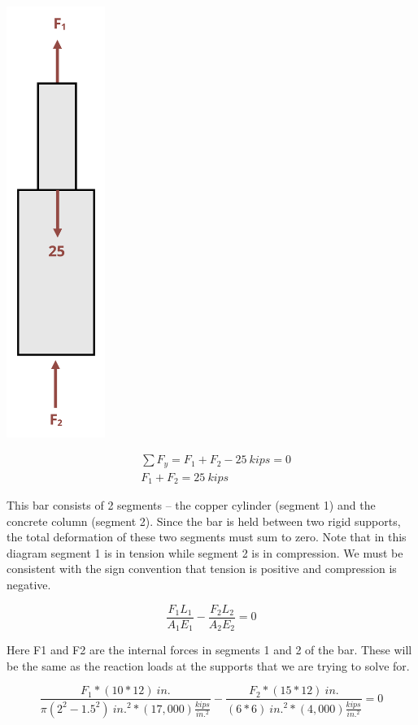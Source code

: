 \documentclass[
  letterpaper,
  DIV=11,
  numbers=noendperiod]{scrreprt}
\theoremstyle{definition}
\theoremstyle{remark}
\begin{document}
\begin{tcolorbox}
\begin{tcolorbox}
\begin{center}
\includegraphics[width=1.26042in,height=\textheight]{images/PNGs/Example 5.6 part 2.png}
\end{center}

\[
\begin{aligned}
& \sum F_y=F_1+F_2-25{~kips}=0 \\
& F_1+F_2=25{~kips}
\end{aligned}
\]

This bar consists of 2 segments -- the copper cylinder (segment 1) and
the concrete column (segment 2). Since the bar is held between two rigid
supports, the total deformation of these two segments must sum to zero.
Note that in this diagram segment 1 is in tension while segment 2 is in
compression. We must be consistent with the sign convention that tension
is positive and compression is negative.

\[
\frac{F_1 L_1}{A_1 E_1}-\frac{F_2 L_2}{A_2 E_2}=0
\]

Here F1 and F2 are the internal forces in segments 1 and 2 of the bar.
These will be the same as the reaction loads at the supports that we are
trying to solve for.

\[
\frac{F_1 *(10 * 12){~in.}}{\pi(2^2-1.5^2){~in.}^2 *(17,000)\frac{kips}{in.^2}}-\frac{F_2 *(15 * 12){~in.}}{(6 * 6){~in.}^2 *(4,000)\frac{kips}{in.^2}}=0
\]


\end{tcolorbox}
\end{tcolorbox}
\end{document}
